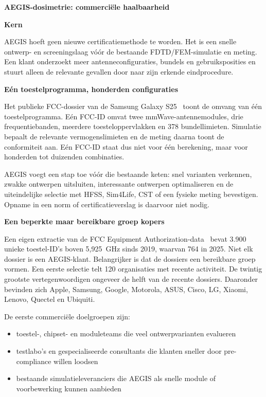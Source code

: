 \documentclass[10pt,a4paper]{article}
\begin{document}
{\Large\bfseries AEGIS-dosimetrie: commerciële haalbaarheid}

\vspace{8pt}

\textbf{Kern}

AEGIS hoeft geen nieuwe certificatiemethode te worden. Het is een snelle ontwerp- en screeningslaag vóór de bestaande FDTD/FEM-simulatie en meting. Een klant onderzoekt meer antenneconfiguraties, bundels en gebruiksposities en stuurt alleen de relevante gevallen door naar zijn erkende eindprocedure.

\textbf{Eén toestelprogramma, honderden configuraties}

Het publieke FCC-dossier van de Samsung Galaxy S25~\cite{samsung_s25_part0,samsung_s25_final} toont de omvang van één toestelprogramma. Eén FCC-ID omvat twee mmWave-antennemodules, drie frequentiebanden, meerdere toesteloppervlakken en 378 bundellimieten. Simulatie bepaalt de relevante vermogenslimieten en de meting daarna toont de conformiteit aan. Eén FCC-ID staat dus niet voor één berekening, maar voor honderden tot duizenden combinaties.

AEGIS voegt een stap toe vóór die bestaande keten: snel varianten verkennen, zwakke ontwerpen uitsluiten, interessante ontwerpen optimaliseren en de uiteindelijke selectie met HFSS, Sim4Life, CST of een fysieke meting bevestigen. Opname in een norm of certificatieverslag is daarvoor niet nodig.

\textbf{Een beperkte maar bereikbare groep kopers}

Een eigen extractie van de FCC Equipment Authorization-data~\cite{fcc_eas} bevat 3.900 unieke toestel-ID's boven 5,925~GHz sinds 2019, waarvan 764 in 2025. Niet elk dossier is een AEGIS-klant. Belangrijker is dat de dossiers een bereikbare groep vormen. Een eerste selectie telt 120 organisaties met recente activiteit. De twintig grootste vertegenwoordigen ongeveer de helft van de recente dossiers. Daaronder bevinden zich Apple, Samsung, Google, Motorola, ASUS, Cisco, LG, Xiaomi, Lenovo, Quectel en Ubiquiti.

De eerste commerciële doelgroepen zijn:

\begin{itemize}
  \item toestel-, chipset- en moduleteams die veel ontwerpvarianten evalueren
  \item testlabo's en gespecialiseerde consultants die klanten sneller door pre-compliance willen loodsen~\cite{ctia_labs}
  \item bestaande simulatieleveranciers die AEGIS als snelle module of voorbewerking kunnen aanbieden~\cite{sim4life}
\end{itemize}
\end{document}
